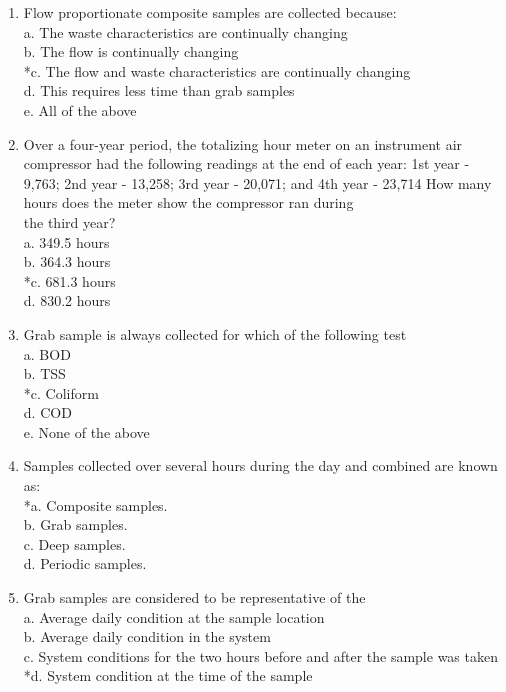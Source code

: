 \begin{enumerate}
\item Flow proportionate composite samples are collected because: \\

a. The waste characteristics are continually changing \\
b. The flow is continually changing \\
*c. The flow and waste characteristics are continually changing \\
d. This requires less time than grab samples \\
e. All of the above 

\item Over a four-year period, the totalizing hour meter on an instrument air compressor had the following readings at the end of each year: 1st year - 9,763; 2nd year - 13,258; 3rd year - 20,071; and 4th year - 23,714 How many hours does the meter show the compressor ran during \\the third year? \\

a. 349.5 hours \\
b. 364.3 hours \\
*c. 681.3 hours \\
d. 830.2 hours 

\item Grab sample is always collected for which of the following test \\

a. BOD \\
b. TSS \\
*c. Coliform \\
d. COD \\
e. None of the above 

\item Samples collected over several hours during the day and combined are known as: \\

*a. Composite samples. \\
b. Grab samples. \\
c. Deep samples. \\
d. Periodic samples. 

\item Grab samples are considered to be representative of the \\

a. Average daily condition at the sample location \\
b. Average daily condition in the system \\
c. System conditions for the two hours before and after the sample was taken \\
*d. System condition at the time of the sample 


\end{enumerate}
